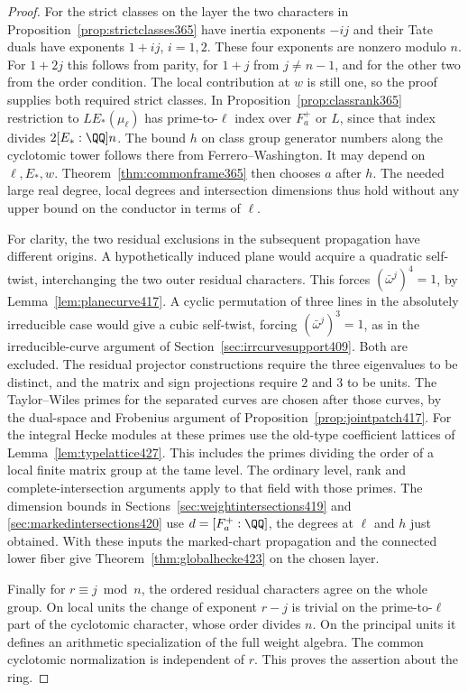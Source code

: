 \documentclass[a4paper,11pt]{article}
\theoremstyle{definition}
\theoremstyle{remark}
\numberwithin{equation}{section}
\begin{document}
\begin{proof}
For the strict classes on the layer the two characters in
Proposition~\ref{prop:strictclasses365} have inertia exponents
\(-ij\) and their Tate duals have exponents \(1+ij\),
\(i=1,2\). These four exponents are nonzero modulo \(n\).
For \(1+2j\) this follows from parity, for \(1+j\) from
\(j\ne n-1\), and for the other two from the order condition.
The local contribution at \(w\) is still one, so the proof
supplies both required strict classes. In
Proposition~\ref{prop:classrank365} restriction to
\(L E_*(\mu_\ell)\) has prime-to-\(\ell\) index over \(F_a^+\)
or \(L\), since that index divides
\(2[E_*:\QQ]n\). The bound \(h\) on class group generator
numbers along the cyclotomic tower follows there from
Ferrero--Washington. It may depend on \(\ell,E_*,w\).
Theorem~\ref{thm:commonframe365} then chooses \(a\) after
\(h\). The needed large real degree, local degrees and
intersection dimensions thus hold without any upper bound
on the conductor in terms of \(\ell\).

For clarity, the two residual exclusions in the subsequent
propagation have different origins. A hypothetically induced
plane would acquire a quadratic self-twist, interchanging
the two outer residual characters. This forces
\((\bar\omega^j)^4=1\), by Lemma~\ref{lem:planecurve417}.
A cyclic permutation of three lines in the absolutely
irreducible case would give a cubic self-twist, forcing
\((\bar\omega^j)^3=1\), as in the irreducible-curve argument
of Section~\ref{sec:irrcurvesupport409}. Both are excluded.
The residual projector constructions require the three
eigenvalues to be distinct, and the matrix and sign
projections require \(2\) and \(3\) to be units. The
Taylor--Wiles primes for the separated curves are chosen
after those curves, by the dual-space and Frobenius
argument of Proposition~\ref{prop:jointpatch417}.
For the integral Hecke modules at these primes use the
old-type coefficient lattices of Lemma~\ref{lem:typelattice427}.
This includes the primes dividing the order of a local finite
matrix group at the tame level.
The ordinary level, rank and complete-intersection arguments
apply to that field with those primes. The dimension bounds
in Sections~\ref{sec:weightintersections419} and
\ref{sec:markedintersections420} use \(d=[F_a^+:\QQ]\),
the degrees at \(\ell\) and \(h\) just obtained. With
these inputs the marked-chart propagation and the connected
lower fiber give Theorem~\ref{thm:globalhecke423} on the
chosen layer.

Finally for \(r\equiv j\bmod n\), the ordered residual
characters agree on the whole group. On local units the
change of exponent \(r-j\) is trivial on the prime-to-\(\ell\)
part of the cyclotomic character, whose order divides \(n\).
On the principal units it defines an arithmetic specialization
of the full weight algebra. The common cyclotomic normalization
is independent of \(r\). This proves the assertion about the ring.
\end{proof}
\end{document}
